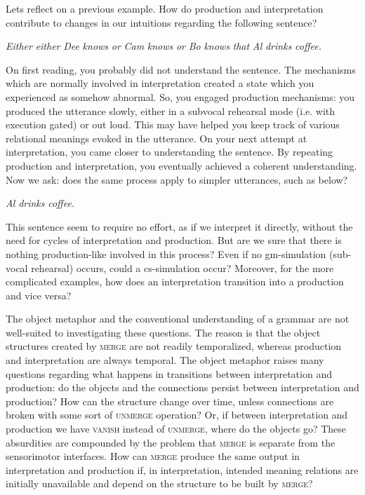  Lets reflect on a previous example. How do production and interpretation contribute to changes in our intuitions regarding the following sentence? 

    \textit{Either} \textit{either} \textit{Dee} \textit{knows} \textit{or} \textit{Cam} \textit{knows} \textit{or} \textit{Bo} \textit{knows} \textit{that} \textit{Al} \textit{drinks} \textit{coffee.}

  On first reading, you probably did not understand the sentence. The mechanisms which are normally involved in interpretation created a state which you experienced as somehow abnormal. So, you engaged production mechanisms: you produced the utterance slowly, either in a subvocal rehearsal mode (i.e. with execution gated) or out loud. This may have helped you keep track of various relational meanings evoked in the utterance. On your next attempt at interpretation, you came closer to understanding the sentence. By repeating production and interpretation, you eventually achieved a coherent understanding. Now we ask: does the same process apply to simpler utterances, such as below?

    \textit{Al} \textit{drinks} \textit{coffee.}

  This sentence seem to require no effort, as if we interpret it directly, without the need for cycles of interpretation and production. But are we sure that there is nothing production-like involved in this process? Even if no gm-simulation (sub-vocal rehearsal) occurs, could a cs-simulation occur? Moreover, for the more complicated examples, how does an interpretation transition into a production and vice versa?

  The object metaphor and the conventional understanding of a grammar are not well-suited to investigating these questions. The reason is that the object structures created by \textsc{merge} are not readily temporalized, whereas production and interpretation are always temporal. The object metaphor raises many questions regarding what happens in transitions between interpretation and production: do the objects and the connections persist between interpretation and production? How can the structure change over time, unless connections are broken with some sort of \textsc{unmerge} operation? Or, if between interpretation and production we have \textsc{vanish} instead of \textsc{unmerge}, where do the objects go? These absurdities are compounded by the problem that \textsc{merge} is separate from the sensorimotor interfaces. How can \textsc{merge} produce the same output in interpretation and production if, in interpretation, intended meaning relations are initially unavailable and depend on the structure to be built by \textsc{merge?} 

